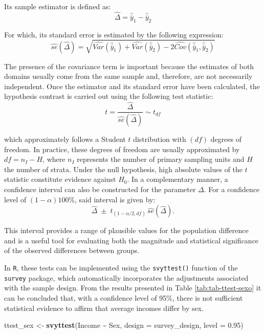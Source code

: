 \documentclass[
  english,
  12pt,
]{book}
\newenvironment{Shaded}{\begin{snugshade}}{\end{snugshade}}
\newcommand{\AttributeTok}[1]{\textcolor[rgb]{0.13,0.29,0.53}{#1}}
\newcommand{\FloatTok}[1]{\textcolor[rgb]{0.00,0.00,0.81}{#1}}
\newcommand{\FunctionTok}[1]{\textcolor[rgb]{0.13,0.29,0.53}{\textbf{#1}}}
\newcommand{\NormalTok}[1]{#1}
\newcommand{\OtherTok}[1]{\textcolor[rgb]{0.56,0.35,0.01}{#1}}
\newcommand{\SpecialCharTok}[1]{\textcolor[rgb]{0.81,0.36,0.00}{\textbf{#1}}}
\begin{document}
Its sample estimator is defined as:
\[
\hat{\Delta} = \hat{\bar{y}}_1 - \hat{\bar{y}}_2
\]

For which, its standard error is estimated by the following expression:
\[
\widehat{se}(\hat{\Delta}) =
\sqrt{
\widehat{Var}(\hat{\bar{y}}_1)
+
\widehat{Var}(\hat{\bar{y}}_2)
-
2\widehat{Cov}(\hat{\bar{y}}_1, \hat{\bar{y}}_2)
}
\]

The presence of the covariance term is important because the estimates of both domains usually come from the same sample and, therefore, are not necessarily independent. Once the estimator and its standard error have been calculated, the hypothesis contrast is carried out using the following test statistic:
\[
t =
\frac{\hat{\Delta}}
{\widehat{se}(\hat{\Delta})} \sim t_{df}
\]

which approximately follows a Student \(t\) distribution with \((df)\) degrees of freedom. In practice, these degrees of freedom are usually approximated by \(df = n_I - H\), where \(n_I\) represents the number of primary sampling units and \(H\) the number of strata. Under the null hypothesis, high absolute values of the \(t\) statistic constitute evidence against \(H_0\). In a complementary manner, a confidence interval can also be constructed for the parameter \(\Delta\). For a confidence level of \((1-\alpha)100\%\), said interval is given by:
\[
\hat{\Delta}
\;\pm\;
t_{(1-\alpha/2,df)}
\,
\hat{se}(\hat{\Delta}).
\]

This interval provides a range of plausible values for the population difference and is a useful tool for evaluating both the magnitude and statistical significance of the observed differences between groups.

In \texttt{R}, these tests can be implemented using the \texttt{svyttest()} function of the \texttt{survey} package, which automatically incorporates the adjustments associated with the sample design. From the results presented in Table \ref{tab:tab-ttest-sexo} it can be concluded that, with a confidence level of 95\%, there is not sufficient statistical evidence to affirm that average incomes differ by sex.

\begin{Shaded}
\begin{Highlighting}[]
\NormalTok{ttest\_sex }\OtherTok{\textless{}{-}} \FunctionTok{svyttest}\NormalTok{(Income }\SpecialCharTok{\textasciitilde{}}\NormalTok{ Sex, }\AttributeTok{design =}\NormalTok{ survey\_design, }\AttributeTok{level =} \FloatTok{0.95}\NormalTok{)}
\end{Highlighting}
\end{Shaded}
\end{document}
